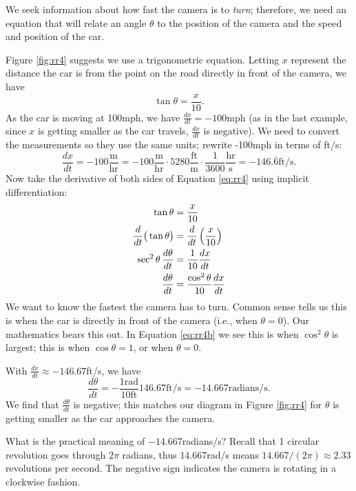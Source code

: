 {We seek information about how fast the camera is to \textit{turn}; therefore, we need an equation that will relate an angle $\theta$ to the position of the camera and the speed and position of the car.

Figure \ref{fig:rr4} suggests we use a trigonometric equation. Letting $x$ represent the distance the car is from the point on the road directly in front of the camera, we have \begin{equation}\tan \theta = \frac{x}{10}.\label{eq:rr4}\end{equation} As the car is moving at 100mph, we have $\frac{dx}{dt} = -100$mph (as in the last example, since $x$ is getting smaller as the car travels, $\frac{dx}{dt}$ is negative). We need to convert the measurements so they use the same units; rewrite -100mph in terms of ft/s:
$$\frac{dx}{dt} = -100\frac{\text{m}}{\text{hr}} = -100\frac{\text{m}}{\text{hr}}\cdot5280\frac{\text{ft}}{\text{m}}\cdot\frac{1}{3600}\frac{\text{hr}}{\text{s}} =-146.\overline{6}\text{ft/s}.$$
Now take the derivative of both sides of Equation \eqref{eq:rr4} using implicit differentiation:
\begin{align}
		\tan \theta &= \frac{x}{10} \notag \\
		\frac{d}{dt}\big(\tan \theta\big) &= \frac{d}{dt}\left(\frac{x}{10}\right)\notag \\
		\sec^2\theta\,\frac{d\theta}{dt} &= \frac{1}{10}\frac{dx}{dt}\notag\\
		\frac{d\theta}{dt} &= \frac{\cos^2\theta}{10}\frac{dx}{dt}\label{eq:rr4b}
\end{align}
We want to know the fastest the camera has to turn. Common sense tells us this is when the car is directly in front of the camera (i.e., when $\theta = 0$). Our mathematics bears this out. In Equation \eqref{eq:rr4b} we see this is when $\cos^2\theta$ is largest; this is when $\cos \theta = 1$, or when $\theta = 0$.

With $\frac{dx}{dt} \approx -146.67$ft/s, we have 
	$$\frac{d\theta}{dt} = -\frac{1\text{rad}}{10\text{ft}}146.67\text{ft/s} = -14.667\text{radians/s}.$$
We find that $\frac{d\theta}{dt}$ is negative; this matches our diagram in Figure \ref{fig:rr4} for $\theta$ is getting smaller as the car approaches the camera.	
	
What is the practical meaning of $-14.667$radians/s? Recall that 1 circular revolution goes through $2\pi$ radians, thus $14.667$rad/s means $14.667/(2\pi)\approx 2.33$ revolutions per second. The negative sign indicates the camera is rotating in a clockwise fashion.
}\\

